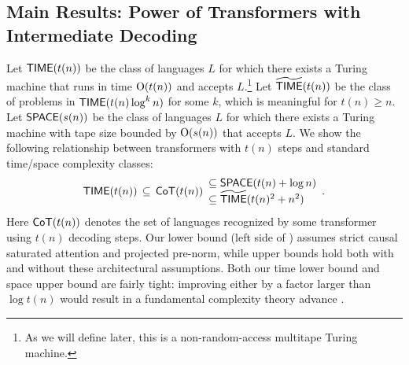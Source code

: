 \documentclass{article} %
\newcommand\change[1]{{\color{blue} #1}}
\renewcommand\change[1]{#1}
\newcommand\changeC[1]{{\color{teal} #1}}
\renewcommand\changeC[1]{#1}
\begin{document}
\subsection{Main Results: Power of Transformers with Intermediate Decoding}


Let $\mathsf{TIME}(t(n))$ be the class of languages $L$ for which there exists a Turing machine that runs in time $\mathrm{O}(t(n))$ and accepts $L$.\footnote{As we will define later, this is a non-random-access multitape Turing machine.} Let $\widetilde{\mathsf{TIME}}(t(n))$ be the class of problems in $\mathsf{TIME}(t(n) \log^k n)$ for some $k$, which is meaningful for $t(n) \geq n$.
Let $\mathsf{SPACE}(s(n))$ be the class of languages $L$ for which there exists a Turing machine with tape size bounded by $\mathrm{O}(s(n))$ that accepts $L$.
We show the following relationship between transformers with $t(n)$ steps and standard time/space complexity classes:
\begin{equation} \label{eq:general}
    \mathsf{TIME}(t(n)) \, \subseteq \, \mathsf{CoT}(t(n))
    \begin{array}{l}
        \subseteq \mathsf{SPACE}(t(n) + \log n) \\
        \subseteq \widetilde{\mathsf{TIME}}(t(n)^2 + n^2)
    \end{array} .
\end{equation}
\change{Here $\mathsf{CoT}(t(n))$ denotes the set of languages recognized by some transformer using $t(n)$ decoding steps. Our lower bound (left side of \Cref{eq:general}) assumes strict causal saturated attention and \changeC{projected} pre-norm, while upper bounds hold both with and without these architectural assumptions.}
Both our time lower bound and space upper bound are fairly tight: improving either by a factor larger than $\log t(n)$ would result in a fundamental complexity theory advance \citep{Hopcroft1977OnTV}.

\end{document}
